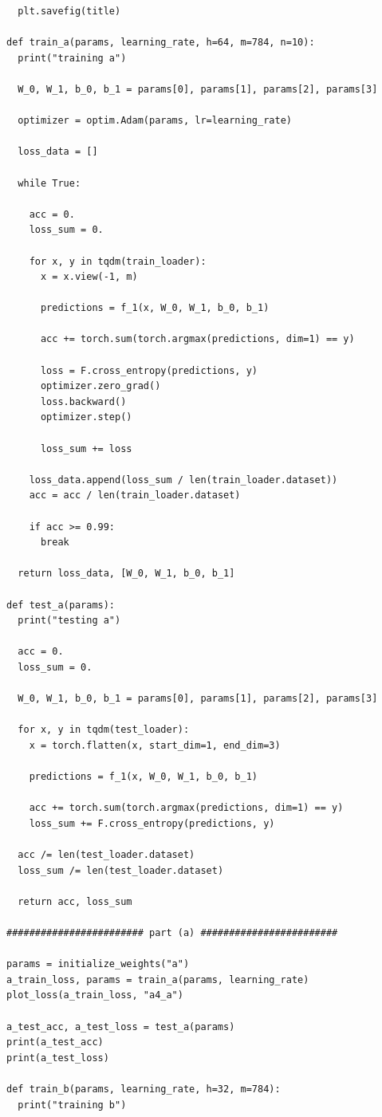 \documentclass{article}
\newcommand{\1}{\mathbf{1}}
\begin{document}
{\begin{verbatim}
  plt.savefig(title)

def train_a(params, learning_rate, h=64, m=784, n=10):
  print("training a")

  W_0, W_1, b_0, b_1 = params[0], params[1], params[2], params[3]  

  optimizer = optim.Adam(params, lr=learning_rate)
  
  loss_data = []
  
  while True:

    acc = 0.
    loss_sum = 0.

    for x, y in tqdm(train_loader):
      x = x.view(-1, m)

      predictions = f_1(x, W_0, W_1, b_0, b_1)

      acc += torch.sum(torch.argmax(predictions, dim=1) == y)

      loss = F.cross_entropy(predictions, y)
      optimizer.zero_grad()
      loss.backward()
      optimizer.step()

      loss_sum += loss
    
    loss_data.append(loss_sum / len(train_loader.dataset))
    acc = acc / len(train_loader.dataset)

    if acc >= 0.99:
      break
  
  return loss_data, [W_0, W_1, b_0, b_1]

def test_a(params):
  print("testing a")

  acc = 0.
  loss_sum = 0.

  W_0, W_1, b_0, b_1 = params[0], params[1], params[2], params[3]

  for x, y in tqdm(test_loader):
    x = torch.flatten(x, start_dim=1, end_dim=3)

    predictions = f_1(x, W_0, W_1, b_0, b_1)

    acc += torch.sum(torch.argmax(predictions, dim=1) == y)
    loss_sum += F.cross_entropy(predictions, y)
  
  acc /= len(test_loader.dataset)
  loss_sum /= len(test_loader.dataset)

  return acc, loss_sum

######################## part (a) ########################

params = initialize_weights("a")
a_train_loss, params = train_a(params, learning_rate)
plot_loss(a_train_loss, "a4_a")

a_test_acc, a_test_loss = test_a(params)
print(a_test_acc)
print(a_test_loss)

def train_b(params, learning_rate, h=32, m=784):
  print("training b")


\end{verbatim}}
\end{document}
